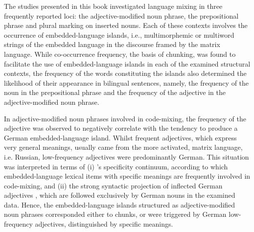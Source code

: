 \begin{sloppypar}
The studies presented in this book investigated language mixing in three frequently reported loci: the adjective-modified noun phrase, the prepositional phrase and plural marking on inserted nouns. Each of these contexts involves the occurrence of embedded-language islands, i.e., multimorphemic or multiword strings of the embedded language in the discourse framed by the matrix language. While co-occurrence frequency, the basis of chunking, was found to facilitate the use of embedded-language islands in each of the examined structural contexts, the frequency of the words constituting the islands also determined the likelihood of their appearance in bilingual sentences, namely, the frequency of the noun in the prepositional phrase and the frequency of the adjective in the adjective-modified noun phrase. 
\end{sloppypar}

In adjective-modified noun phrases involved in code-mixing, the frequency of the adjective was observed to negatively correlate with the tendency to produce a German embedded-language island. Whilst frequent adjectives, which express very general meanings, usually came from the more activated, matrix language, i.e. Russian, low-frequency adjectives were predominantly German. This situation was interpreted in terms of (i) \citeauthor{backus-2001}'s specificity continuum, according to which embedded-language lexical items with specific meanings are frequently involved in code-mixing, and (ii) the strong syntactic projection of inflected German adjectives \citep{auer_projection_2005,auer_syntax_2007}, which are followed exclusively by German nouns in the examined data. Hence, the embedded-language islands structured as adjective-modified noun phrases corresponded either to chunks, or were triggered by German low-frequency adjectives, distinguished by specific meanings. 

